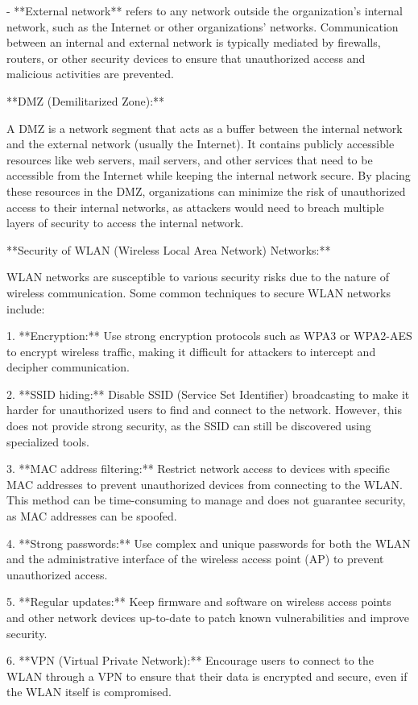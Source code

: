 \documentclass{article}
\begin{document}
- **External network** refers to any network outside the organization's internal network, such as the Internet or other organizations' networks. Communication between an internal and external network is typically mediated by firewalls, routers, or other security devices to ensure that unauthorized access and malicious activities are prevented.

**DMZ (Demilitarized Zone):**

A DMZ is a network segment that acts as a buffer between the internal network and the external network (usually the Internet). It contains publicly accessible resources like web servers, mail servers, and other services that need to be accessible from the Internet while keeping the internal network secure. By placing these resources in the DMZ, organizations can minimize the risk of unauthorized access to their internal networks, as attackers would need to breach multiple layers of security to access the internal network.

**Security of WLAN (Wireless Local Area Network) Networks:**

WLAN networks are susceptible to various security risks due to the nature of wireless communication. Some common techniques to secure WLAN networks include:

1. **Encryption:** Use strong encryption protocols such as WPA3 or WPA2-AES to encrypt wireless traffic, making it difficult for attackers to intercept and decipher communication.

2. **SSID hiding:** Disable SSID (Service Set Identifier) broadcasting to make it harder for unauthorized users to find and connect to the network. However, this does not provide strong security, as the SSID can still be discovered using specialized tools.

3. **MAC address filtering:** Restrict network access to devices with specific MAC addresses to prevent unauthorized devices from connecting to the WLAN. This method can be time-consuming to manage and does not guarantee security, as MAC addresses can be spoofed.

4. **Strong passwords:** Use complex and unique passwords for both the WLAN and the administrative interface of the wireless access point (AP) to prevent unauthorized access.

5. **Regular updates:** Keep firmware and software on wireless access points and other network devices up-to-date to patch known vulnerabilities and improve security.

6. **VPN (Virtual Private Network):** Encourage users to connect to the WLAN through a VPN to ensure that their data is encrypted and secure, even if the WLAN itself is compromised.
\end{document}

